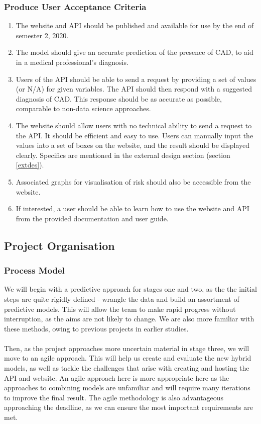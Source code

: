 \documentclass[a4paper, 12pt]{article}
\begin{document}
        \subsubsection{Produce User Acceptance Criteria} \label{Acceptance_Critera}
        \begin{enumerate}
            \item The website and API should be published and available for use by the end of semester 2, 2020.
            \item The model should give an accurate prediction of the presence of CAD, to aid in a medical professional's diagnosis.
            \item Users of the API should be able to send a request by providing a set of values (or N/A) for given variables. The API should then respond with a suggested diagnosis of CAD. This response should be as accurate as possible, comparable to non-data science approaches.
            \item The website should allow users with no technical ability to send a request to the API. It should be efficient and easy to use. Users can manually input the values into a set of boxes on the website, and the result should be displayed clearly. Specifics are mentioned in the external design section (section \ref{extdes}).
            \item Associated graphs for visualisation of risk should also be accessible from the website.
            \item If interested, a user should be able to learn how to use the website and API from the provided documentation and user guide.
        \end{enumerate}

    \subsection{Project Organisation}
        \subsubsection{Process Model}
        We will begin with a predictive approach for stages one and two, as the the initial steps are quite rigidly defined - wrangle the data and build an assortment of predictive models. This will allow the team to make rapid progress without interruption, as the aims are not likely to change. We are also more familiar with these methods, owing to previous projects in earlier studies.
        \\\\
        Then, as the project approaches more uncertain material in stage three, we will move to an agile approach. This will help us create and evaluate the new hybrid models, as well as tackle the challenges that arise with creating and hosting the API and website. An agile approach here is more appropriate here as the approaches to combining models are unfamiliar and will require many iterations to improve the final result. The agile methodology is also advantageous approaching the deadline, as we can ensure the most important requirements are met. %
        
\end{document}
